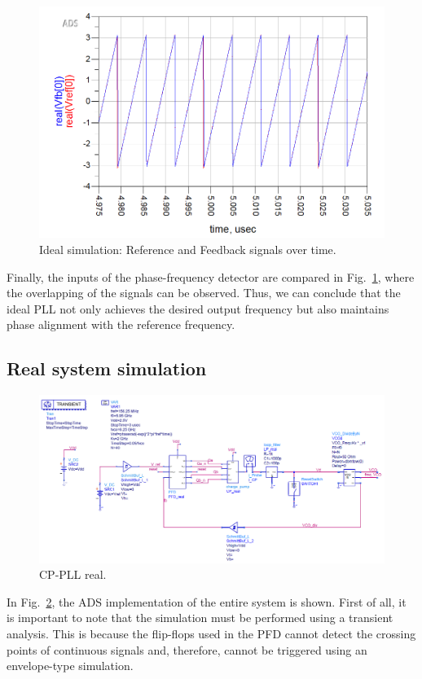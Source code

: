\documentclass[lettersize,journal]{IEEEtran}
\begin{document}
\begin{figure}[!h]
    \centering
    \includegraphics[width=1\linewidth]{images/ads_results/ideal_pll/Vref_Vfb_idea.png}
    \caption{Ideal simulation: Reference and Feedback signals over time.}
    \label{fig:Vref_Vfb_ideal}
\end{figure}

Finally, the inputs of the phase-frequency detector are compared in Fig.~\ref{fig:Vref_Vfb_ideal}, where the overlapping of the signals can be observed. Thus, we can conclude that the ideal PLL not only achieves the desired output frequency but also maintains phase alignment with the reference frequency.

\subsection{Real system simulation}

\begin{figure}[!hb]
    \centering
    \includegraphics[width=0.75\linewidth]{images/ads_results/real_pll/pll_real.png}
    \caption{CP-PLL real.}
    \label{fig:PLL_real}
\end{figure}

In Fig.~\ref{fig:PLL_real}, the ADS implementation of the entire system is shown. First of all, it is important to note that the simulation must be performed using a transient analysis. This is because the flip-flops used in the PFD cannot detect the crossing points of continuous signals and, therefore, cannot be triggered using an envelope-type simulation. 
\end{document}
